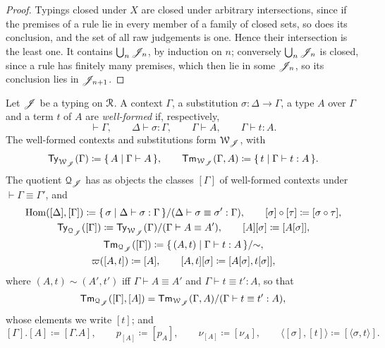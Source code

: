 \begin{proof}
    Typings closed under $X$ are closed under arbitrary intersections, since if the premises of a rule lie in every member of a family of closed sets, so does its conclusion, and the set of all raw judgements is one. Hence their intersection is the least one. It contains $\bigcup_n \mathscr{J}_n$, by induction on $n$; conversely $\bigcup_n \mathscr{J}_n$ is closed, since a rule has finitely many premises, which then lie in some $\mathscr{J}_n$, so its conclusion lies in $\mathscr{J}_{n+1}$.
\end{proof}

\begin{definition}\label{def:well-formed}
    Let $\mathscr{J}$ be a typing on $\mathcal{R}$. A context $\Gamma$, a substitution $\sigma : \Delta \to \Gamma$, a type $A$ over $\Gamma$ and a term $t$ of $A$ are \emph{well-formed} if, respectively,
    \[
        {\vdash \Gamma}, \qquad \Delta \vdash \sigma : \Gamma, \qquad \Gamma \vdash A, \qquad \Gamma \vdash t : A.
    \]
    The well-formed contexts and substitutions form $\mathcal{W}_{\mathscr{J}}$, with
    \[
        \mathsf{Ty}_{\mathcal{W}_{\mathscr{J}}}(\Gamma) \coloneqq \{\, A \mid \Gamma \vdash A \,\}, \qquad \mathsf{Tm}_{\mathcal{W}_{\mathscr{J}}}(\Gamma, A) \coloneqq \{\, t \mid \Gamma \vdash t : A \,\}.
    \]
    The quotient $\mathcal{Q}_{\mathscr{J}}$ has as objects the classes $[\Gamma]$ of well-formed contexts under $\vdash \Gamma \equiv \Gamma'$, and
    \begin{gather*}
        \operatorname{Hom}([\Delta], [\Gamma]) \coloneqq \{\, \sigma \mid \Delta \vdash \sigma : \Gamma \,\} / (\Delta \vdash \sigma \equiv \sigma' : \Gamma), \qquad [\sigma] \circ [\tau] \coloneqq [\sigma \circ \tau],\\
        \mathsf{Ty}_{\mathcal{Q}_{\mathscr{J}}}([\Gamma]) \coloneqq \mathsf{Ty}_{\mathcal{W}_{\mathscr{J}}}(\Gamma) / (\Gamma \vdash A \equiv A'), \qquad [A][\sigma] \coloneqq [A[\sigma]],\\
        \mathsf{Tm}_{\mathcal{Q}_{\mathscr{J}}}([\Gamma]) \coloneqq \{\, (A, t) \mid \Gamma \vdash t : A \,\} / {\sim},\\
        \varpi([A, t]) \coloneqq [A], \qquad [A, t][\sigma] \coloneqq [A[\sigma], t[\sigma]],
    \end{gather*}
    where $(A, t) \sim (A', t')$ iff $\Gamma \vdash A \equiv A'$ and $\Gamma \vdash t \equiv t' : A$, so that
    \[
        \mathsf{Tm}_{\mathcal{Q}_{\mathscr{J}}}([\Gamma], [A]) = \mathsf{Tm}_{\mathcal{W}_{\mathscr{J}}}(\Gamma, A) / (\Gamma \vdash t \equiv t' : A),
    \]
    whose elements we write $[t]$; and
    \[
        [\Gamma].[A] \coloneqq [\Gamma.A], \qquad p_{[A]} \coloneqq [p_A], \qquad \nu_{[A]} \coloneqq [\nu_A], \qquad \langle [\sigma], [t] \rangle \coloneqq [\langle \sigma, t \rangle].
    \]
\end{definition}

